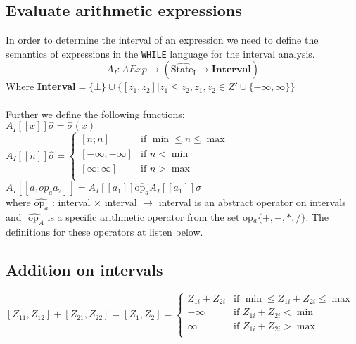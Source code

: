 \subsection{Evaluate arithmetic expressions}
In order to determine the interval of an expression we need to define the semantics of expressions in the \texttt{WHILE} language for the interval analysis.
\begin{equation}
A_I : AExp \rightarrow (\widehat{\text{State}_{\text{I}}} \rightarrow \textbf{Interval})
\end{equation} 
Where  \textbf{Interval}$=\{\bot\}\cup\{[z_1,z_2]|z_1\leq z_2,z_1,z_2\in Z'\cup\{-\infty,\infty\}\}$
\\\\
Further we define the following functions:\\
$A_I[\![x]\!]\widehat{\sigma} = \widehat{\sigma}(x)$ \\
$A_I[\![n]\!]\widehat{\sigma} = 
     \begin{cases} 
        [n;n] & \text{if } \min \leq n \leq \max \\
        [-\infty;-\infty] & \text{if } n < \min\\
        [\infty;\infty] & \text{if } n > \max\\
     \end{cases}$\\
$A_I[\![a_1 op_a a_2 ]\!] = A_I[\![a_1]\!] \widehat{\text{op}_a} A_I[\![a_1]\!]\sigma $\\
where $\widehat{\text{op}_a}$ : interval $\times$ interval $\rightarrow$ interval is an abstract operator on intervals and $\widehat{\text{ op}_A}$ is a specific arithmetic operator from the set op$_a \{+,-,*,/\}$.
The definitions for these operators at listen below.

\subsection{Addition on intervals}
$[Z_{11},Z_{12}] + [Z_{21},Z_{22}] = [Z_{1},Z_{2}] =
     \begin{cases} 
        Z_{1i} + Z_{2i} & \text{if } \min \leq Z_{1i} + Z_{2i} \leq \max \\
        -\infty         & \text{if } Z_{1i} + Z_{2i} < \min \\
        \infty          & \text{if } Z_{1i} + Z_{2i} > \max\\
     \end{cases}
$


